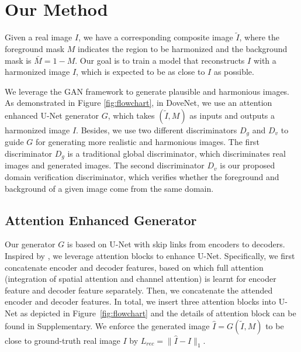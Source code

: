 \documentclass[10pt,twocolumn,letterpaper]{article}
\begin{document}
\section{Our Method}
Given a real image $I$, we have a corresponding composite image $\tilde I$, where the foreground mask $M$ indicates the region to be harmonized and the background mask is $\bar M = 1-M$. Our goal is to train a model that reconstructs $I$ with a harmonized image $\hat I$, which is expected to be as close to $I$ as possible.

We leverage the GAN \cite{goodfellow2014generative} framework to generate plausible and harmonious images. As demonstrated in Figure \ref{fig:flowchart}, in DoveNet, we use an attention enhanced U-Net generator $G$, which takes $(\tilde I, M)$ as inputs and outputs a harmonized image $\hat I$. Besides, we use two different discriminators $D_g$ and $D_v$ to guide $G$ for generating more realistic and harmonious images. The first discriminator $D_g$ is a traditional global discriminator, which discriminates real images and generated images. The second discriminator $D_v$ is our proposed domain verification discriminator, which verifies whether the foreground and background of a given image come from the same domain. 

\subsection{Attention Enhanced Generator}
Our generator $G$ is based on U-Net \cite{ronneberger2015u} with skip links from encoders to decoders. Inspired by \cite{xiaodong2019improving}, we leverage attention blocks to enhance U-Net. Specifically, we first concatenate encoder and decoder features, based on which full attention~\cite{yu2019free} (integration of spatial attention and channel attention) is learnt for encoder feature and decoder feature separately. Then, we concatenate the attended encoder and decoder features. In total, we insert three attention blocks into U-Net as depicted in Figure~\ref{fig:flowchart} and the details of attention block can be found in Supplementary.
We enforce the generated image $\hat I=G(\tilde I, M)$ to be close to ground-truth real image $I$ by $L_{rec} = \|\hat I-I\|_1$.
\end{document}
